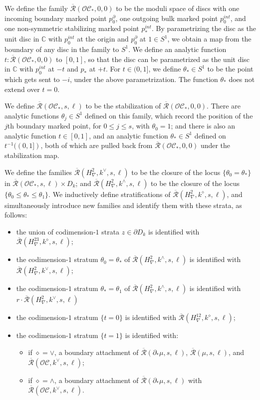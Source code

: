 \documentclass{article}
\def\cO{\mathcal{O}}
\def\cC{\mathcal{C}}
\def\Rbar{\overline{\mathcal{R}}}
\def\C{\mathbb{C}}
\begin{document}
We define the family $\Rbar(\cO\cC_*,0,0)$ to be the moduli space of discs with one incoming boundary marked point $p_0^\partial$, one outgoing bulk marked point $p_0^{int}$, and one non-symmetric stabilizing marked point $p_*^{int}$. 
By parametrizing the disc as the unit disc in $\C$ with $p_0^{int}$ at the origin and $p_0^\partial$ at $1 \in S^1$, we obtain a map from the boundary of any disc in the family to $S^1$. 
We define an analytic function $t:\Rbar(\cO\cC_*,0,0)$ to $[0,1]$, so that the disc can be parametrized as the unit disc in $\C$ with $p_0^{int}$ at $-t$ and $p_*$ at $+t$. 
For $t \in (0,1]$, we define $\theta_* \in S^1$ to be the point which gets sent to $-i$, under the above parametrization. The function $\theta_*$ does not extend over $t=0$.

We define $\Rbar(\cO\cC_*,s,\ell)$ to be the stabilization of $\Rbar(\cO\cC_*,0,0)$. 
There are analytic functions $\theta_j \in S^1$ defined on this family, which record the position of the $j$th boundary marked point, for $0 \le j \le s$, with $\theta_0 = 1$; and there is also an analytic function $t \in [0,1]$, and an analytic function $\theta_* \in S^1$ defined on $t^{-1}((0,1])$, both of which are pulled back from $\Rbar(\cO\cC_*,0,0)$ under the stabilization map. 

We define the families $\Rbar(H^2_\nabla,k^\vee,s,\ell)$ to be the closure of the locus $\{\theta_0=\theta_*\}$ in $\Rbar(\cO\cC_*,s,\ell) \times D_k$; and $\Rbar(H^2_\nabla,k^\wedge,s,\ell)$ to be the closure of the locus $\{\theta_0 \le \theta_* \le \theta_1\}$. 
We inductively define stratifications of $\Rbar(H^2_\nabla,k^\diamond,s,\ell)$, and simultaneously introduce new families and identify them with these strata, as follows:
\begin{itemize}
    \item the union of codimension-$1$ strata $z \in \partial D_k$ is identified with $\Rbar(H^{23}_\nabla,k^\diamond,s,\ell)$;
    \item the codimension-$1$ stratum $\theta_0= \theta_*$ of $\Rbar(H^2_\nabla,k^\wedge,s,\ell)$ is identified with $\Rbar(H^2_\nabla,k^\vee,s,\ell)$;
    \item the codimension-$1$ stratum $\theta_* = \theta_1$ of $\Rbar(H^2_\nabla,k^\wedge,s,\ell)$ is identified with $r\cdot \Rbar(H^2_\nabla,k^\vee,s,\ell)$
    \item the codimension-$1$ stratum $\{t=0\}$ is identified with $\Rbar(H^{12}_\nabla,k^\diamond,s,\ell)$;
    \item the codimension-$1$ stratum $\{t=1\}$ is identified with:
    \begin{itemize}
        \item if $\diamond = \vee$, a boundary attachment of $\Rbar(\partial_*\mu,s,\ell)$, $\Rbar(\mu,s,\ell)$, and $\Rbar(\cO\cC,k^\vee,s,\ell)$;
        \item if $\diamond = \wedge$, a boundary attachment of $\Rbar(\partial_*\mu,s,\ell)$ with $\Rbar(\cO\cC,k^\vee,s,\ell)$.
    \end{itemize}
\end{itemize}
\end{document}
